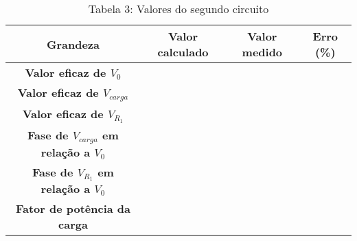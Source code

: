 \vspace{5pt}
\begin{table}[h]
\centering
\begin{tabular}{|c|c|c|c|}
\hline
\textbf{Grandeza} & \textbf{Valor calculado} & \textbf{Valor medido} & \textbf{Erro (\%) }\\\hline
\textbf{Valor eficaz de $V_0$} & & & \\\hline
\textbf{Valor eficaz de $V_{carga}$} & & & \\\hline
\textbf{Valor eficaz de $V_{R_1}$} & & & \\\hline
\textbf{Fase de $V_{carga}$ em relação a $V_0$} & & & \\\hline
\textbf{Fase de $V_{R_1}$ em relação a $V_0$} & & & \\\hline
\textbf{Fator de potência da carga} & & & \\\hline
\end{tabular}
\caption*{Tabela 3: Valores do segundo circuito}
\end{table}